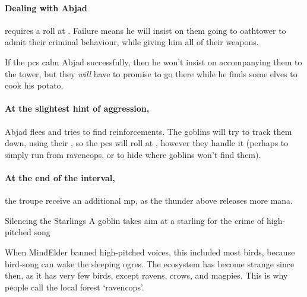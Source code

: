 
\paragraph{Dealing with Abjad}
requires a  roll at \tn[9].
Failure means he will insist on them going to \gls{oathtower} to admit their criminal behaviour, while giving him all of their \glspl{weapon}.

If the \glspl{pc} calm Abjad successfully, then he won't insist on accompanying them to the tower, but they \emph{will} have to promise to go there while he finds some elves to cook his potato.

\paragraph{At the slightest hint of aggression,}
Abjad flees and tries to find reinforcements.
The goblins will try to track them down, using their , so the \glspl{pc} will roll at \tn, however they handle it (perhaps  to simply run from \gls{ravencops}, or  to hide where goblins won't find them).

\paragraph{At the end of the \gls{interval},}
the troupe receive an additional \gls{mp}, as the thunder above releases more mana.

{Silencing the Starlings}%
{A goblin takes aim at a starling for the crime of high-pitched song}%


\begin{exampletext}
  When \gls{MindElder} banned high-pitched voices, this included most birds, because bird-song can wake the sleeping \glspl{ogre}.
  The ecosystem has become strange since then, as it has very few birds, except ravens, crows, and magpies.
  This is why people call the local forest `\gls{ravencops}'.
\end{exampletext}

